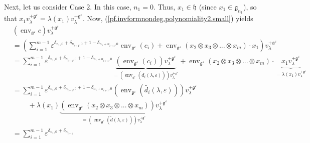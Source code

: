 \documentclass
[numbers=enddot,12pt,final,onecolumn,german,notitlepage]{scrartcl}%
\theoremstyle{definition}
\begin{document}
Next, let us consider Case 2. In this case, $n_{1}=0$. Thus, $x_{1}%
\in\mathfrak{h}$ (since $x_{1}\in\mathfrak{g}_{n_{1}}$), so that
$x_{1}v_{\lambda}^{+\mathfrak{g}^{\varepsilon}}=\lambda\left(  x_{1}\right)
v_{\lambda}^{+\mathfrak{g}^{\varepsilon}}$. Now,
(\ref{pf.invformnondeg.polynomiality2.small}) yields%
\begin{align}
&  \left(  \operatorname*{env}\nolimits_{\mathfrak{g}^{\varepsilon}}c\right)
v_{\lambda}^{+\mathfrak{g}^{\varepsilon}}\nonumber\\
&  =\left(  \sum\limits_{i=1}^{m-1}\varepsilon^{\delta_{n_{1},0}%
+\delta_{n_{i+1},0}+1-\delta_{n_{1}+n_{i+1},0}}\operatorname*{env}%
\nolimits_{\mathfrak{g}^{\varepsilon}}\left(  c_{i}\right)
+\operatorname*{env}\nolimits_{\mathfrak{g}^{\varepsilon}}\left(  x_{2}\otimes
x_{3}\otimes...\otimes x_{m}\right)  \cdot x_{1}\right)  v_{\lambda
}^{+\mathfrak{g}^{\varepsilon}}\nonumber\\
&  =\sum\limits_{i=1}^{m-1}\varepsilon^{\delta_{n_{1},0}+\delta_{n_{i+1}%
,0}+1-\delta_{n_{1}+n_{i+1},0}}\underbrace{\left(  \operatorname*{env}%
\nolimits_{\mathfrak{g}^{\varepsilon}}\left(  c_{i}\right)  \right)
v_{\lambda}^{+\mathfrak{g}^{\varepsilon}}}_{=\left(  \operatorname*{env}%
\nolimits_{\mathfrak{g}^{\varepsilon}}\left(  \widetilde{d_{i}}\left(
\lambda,\varepsilon\right)  \right)  \right)  v_{\lambda}^{+\mathfrak{g}%
^{\varepsilon}}}+\operatorname*{env}\nolimits_{\mathfrak{g}^{\varepsilon}%
}\left(  x_{2}\otimes x_{3}\otimes...\otimes x_{m}\right)  \cdot
\underbrace{x_{1}v_{\lambda}^{+\mathfrak{g}^{\varepsilon}}}_{=\lambda\left(
x_{1}\right)  v_{\lambda}^{+\mathfrak{g}^{\varepsilon}}}\nonumber\\
&  =\sum\limits_{i=1}^{m-1}\varepsilon^{\delta_{n_{1},0}+\delta_{n_{i+1}%
,0}+1-\delta_{n_{1}+n_{i+1},0}}\left(  \operatorname*{env}%
\nolimits_{\mathfrak{g}^{\varepsilon}}\left(  \widetilde{d_{i}}\left(
\lambda,\varepsilon\right)  \right)  \right)  v_{\lambda}^{+\mathfrak{g}%
^{\varepsilon}}\nonumber\\
&  \ \ \ \ \ \ \ \ \ \ +\lambda\left(  x_{1}\right)  \underbrace{\left(
\operatorname*{env}\nolimits_{\mathfrak{g}^{\varepsilon}}\left(  x_{2}\otimes
x_{3}\otimes...\otimes x_{m}\right)  \right)  v_{\lambda}^{+\mathfrak{g}%
^{\varepsilon}}}_{=\left(  \operatorname*{env}\nolimits_{\mathfrak{g}%
^{\varepsilon}}\left(  \widetilde{d}\left(  \lambda,\varepsilon\right)
\right)  \right)  v_{\lambda}^{+\mathfrak{g}^{\varepsilon}}}\nonumber\\
&  =\sum\limits_{i=1}^{m-1}\varepsilon^{\delta_{n_{1},0}+\delta_{n_{i+1}%
}}
\end{align}
\end{document}
